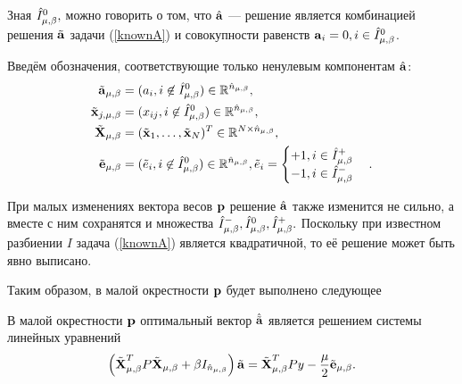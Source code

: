 Зная $\hat I^0_{\mu,\beta},$ можно говорить о том, что $\hat{\boldsymbol{\mathbf{a}}}$ --- решение является комбинацией решения $\tilde{{\boldsymbol{\mathbf{a}}}}$ задачи (\ref{knownA}) и совокупности равенств $\boldsymbol{\mathbf{a}}_i = 0, i\in \hat I^0_{\mu,\beta}$.

Введём обозначения, соответствующие только ненулевым компонентам $\hat{\boldsymbol{\mathbf{a}}}$:
\begin{align*}
	\tilde{\boldsymbol{\mathbf{a}}}_{\mu,\beta} &= (a_i, i\not\in \hat I^0_{\mu,\beta}) \in \mathbb{R}^{\hat n_{\mu,\beta}}, \\
	\tilde{\boldsymbol{\mathbf{x}}}_{j,{\mu,\beta}} &= (x_{ij}, i\not\in \hat I^0_{\mu,\beta}) \in \mathbb{R}^{\hat n_{\mu,\beta}}, \\
	\tilde{\boldsymbol{\mathbf{X}}}_{\mu,\beta} &= (\tilde{\boldsymbol{\mathbf{x}}}_1, \ldots, \tilde{\boldsymbol{\mathbf{x}}}_N)^T \in \mathbb{R}^{N \times \hat n_{\mu,\beta}}, \\
	\tilde{\boldsymbol{\mathbf{e}}}_{\mu,\beta} &= (\tilde e_i, i\not\in \hat I^0_{\mu,\beta}) \in \mathbb{R}^{\hat n_{\mu,\beta}},
		\tilde e_i = \begin{cases}+1, i \in \hat I^+_{\mu,\beta} \\-1, i \in \hat I^-_{\mu,\beta}\end{cases}.
\end{align*}

При малых изменениях вектора весов $\boldsymbol{\mathbf{p}}$ решение $\hat{\boldsymbol{\mathbf{a}}}$ также изменится не сильно, а вместе с ним сохранятся и множества $\hat I^-_{\mu,\beta}, \hat I^0_{\mu,\beta}, \hat I^+_{\mu,\beta}.$ Поскольку при известном разбиении $I$ задача (\ref{knownA}) является квадратичной, то её решение может быть явно выписано.

Таким образом, в малой окрестности $\boldsymbol{\mathbf{p}}$ будет выполнено следующее

\begin{statement}
\label{stmnt:locally_linear}
В малой окрестности $\boldsymbol{\mathbf{p}}$ оптимальный вектор $\hat{\tilde{\mathbf a}}$ является решением системы линейных уравнений
\begin{equation*}
	\left(\tilde{\boldsymbol{\mathbf{X}}}^T_{\mu,\beta} P\tilde{\boldsymbol{\mathbf{X}}}_{\mu,\beta} + \beta I_{\hat n_{\mu,\beta}}\right) \tilde{\boldsymbol{\mathbf{a}}}
		= \tilde{\boldsymbol{\mathbf{X}}}^T_{\mu,\beta} P y -\frac\mu2\tilde{\boldsymbol{\mathbf{e}}}_{\mu,\beta}.
\end{equation*}
\end{statement}

